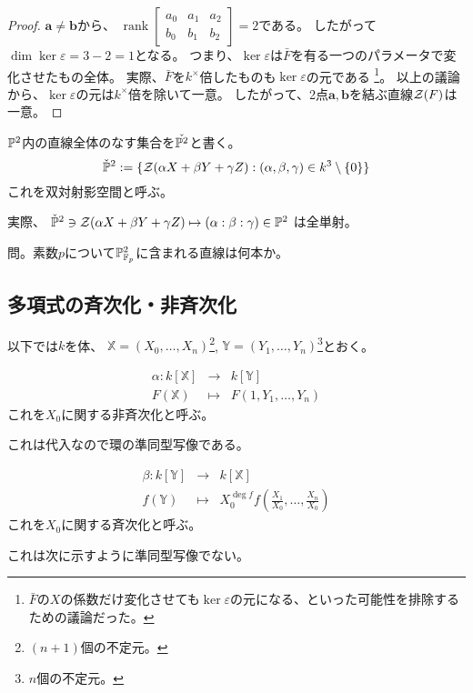 \documentclass[a4paper]{jsarticle}
\begin{document}
\begin{proof}
        $\mathbf{a} \neq \mathbf{b}$から、
        $\operatorname{rank} \left[ \begin{array}{ccc} a_0 & a_1 & a_2 \\ b_0 & b_1 & b_2 \end{array} \right]=2$である。
        したがって$\dim \ker \varepsilon=3-2=1$となる。
        つまり、$\ker \varepsilon$は$\bar{F}$を有る一つのパラメータで変化させたもの全体。
        実際、$\bar{F}$を$k^{\times}$倍したものも$\ker \varepsilon$の元である
        \footnote{$\bar{F}$の$X$の係数だけ変化させても$\ker \varepsilon$の元になる、といった可能性を排除するための議論だった。}。
        以上の議論から、$\ker \varepsilon$の元は$k^{\times}$倍を除いて一意。
        したがって、2点$\mathbf{a}, \mathbf{b}$を結ぶ直線$\mathcal{Z}(F)$は一意。
        
    \end{proof}

    \begin{Def}
        $\mathbb{P}^2$内の直線全体のなす集合を$\check{\mathbb{P}^2}$と書く。
        \[ \check{\mathbb{P}}^2 := \{\mathcal{Z}(\alpha X+ \beta Y+ \gamma Z) : (\alpha, \beta, \gamma) \in k^3 \setminus\{0\} \}\]
        これを双対射影空間と呼ぶ。
    \end{Def}
    実際、
    $\check{\mathbb{P}}^2 \ni \mathcal{Z}(\alpha X+ \beta Y+ \gamma Z) \mapsto (\alpha : \beta : \gamma) \in \mathbb{P}^2$
    は全単射。
    
    問。素数$p$について$\mathbb{P}^2_{\mathbb{F}_p}$に含まれる直線は何本か。

    \subsection{多項式の斉次化・非斉次化}
    以下では$k$を体、
    $\mathbb{X}=(X_0, \dots, X_n)$\footnote{$(n+1)$個の不定元。},
    $\mathbb{Y}=(Y_1, \dots, Y_n)$\footnote{$n$個の不定元。}とおく。

    \begin{Def}[非斉次化]
    \begin{eqnarray*}
        \alpha :
            k[\mathbb{X}] &\to& k[\mathbb{Y}]\\
            F(\mathbb{X}) &\mapsto& F(1, Y_1, \dots, Y_n)
    \end{eqnarray*}
    これを$X_0$に関する非斉次化と呼ぶ。
    \end{Def}
    これは代入なので環の準同型写像である。

    \begin{Def}[斉次化]
    \begin{eqnarray*}
        \beta :
            k[\mathbb{Y}] &\to& k[\mathbb{X}] \\
            f(\mathbb{Y}) &\mapsto& X_0^{\deg f} f \left( \frac{X_1}{X_0}, \dots, \frac{X_n}{X_0} \right)
    \end{eqnarray*}
    これを$X_0$に関する斉次化と呼ぶ。
    \end{Def}
    これは次に示すように準同型写像でない。
\end{document}
